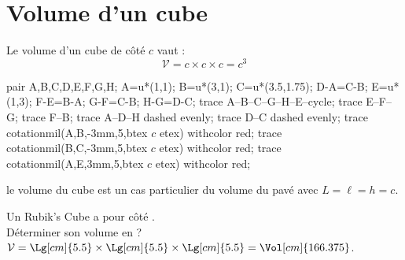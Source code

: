 \section{Volume d'un cube}

\begin{propriete}
    \begin{minipage}{0.4\linewidth}
    Le volume d'un cube de côté $c$ vaut :
    $${\mathcal V}=c\times c\times c =c^3$$
    \end{minipage}
    \hfill
    \begin{minipage}{0.4\linewidth}
    \begin{center}
        \begin{Geometrie}[CoinBG={(0,0)},CoinHD={(4u,4u)}]
            pair A,B,C,D,E,F,G,H;
            A=u*(1,1);
            B=u*(3,1);
            C=u*(3.5,1.75);
            D-A=C-B;
            E=u*(1,3);
            F-E=B-A;
            G-F=C-B;
            H-G=D-C;
            trace A--B--C--G--H--E--cycle;
            trace E--F--G;
            trace F--B;
            trace A--D--H dashed evenly;
            trace D--C dashed evenly;
            trace cotationmil(A,B,-3mm,5,btex $c$ etex) withcolor red;
            trace cotationmil(B,C,-3mm,5,btex $c$ etex) withcolor red;
            trace cotationmil(A,E,3mm,5,btex $c$ etex) withcolor red;
        \end{Geometrie}
    \end{center}
\end{minipage}
\end{propriete}



\begin{remarque}
   le volume du cube est un cas particulier du volume du pavé avec $L =\ell =h =c$.
\end{remarque}

\begin{exemple}
   Un Rubik's Cube a pour côté . \\
   Déterminer son volume en \Vol[cm]{} ?
   \correction
      $\mathcal{V} =\Lg[cm]{5.5}\times\Lg[cm]{5.5}\times\Lg[cm]{5.5} = \Vol[cm]{166.375}$.
\end{exemple}